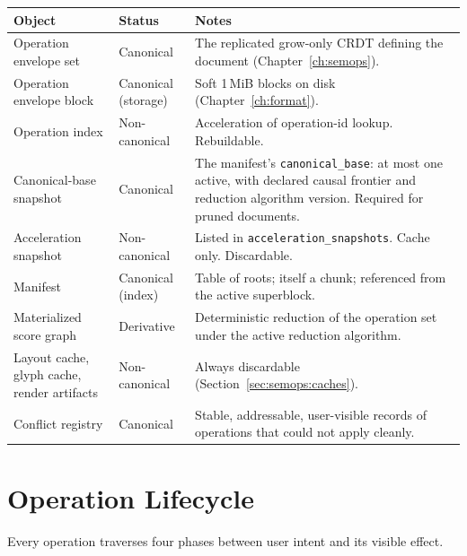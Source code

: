 \documentclass[11pt,letterpaper]{report}
\begin{document}
\begin{longtable}{p{4.4cm} p{4.0cm} p{5.2cm}}
  \toprule
  \textbf{Object} & \textbf{Status} & \textbf{Notes} \\
  \midrule
  \endhead
  Operation envelope set & Canonical &
    The replicated grow-only CRDT defining the document
    (Chapter~\ref{ch:semops}). \\
  Operation envelope block & Canonical (storage) &
    Soft 1\,MiB blocks on disk
    (Chapter~\ref{ch:format}). \\
  Operation index & Non-canonical &
    Acceleration of operation-id lookup. Rebuildable. \\
  Canonical-base snapshot & Canonical &
    The manifest's \texttt{canonical\_base}: at most one active,
    with declared causal frontier and reduction algorithm
    version. Required for pruned documents. \\
  Acceleration snapshot & Non-canonical &
    Listed in \texttt{acceleration\_snapshots}. Cache only.
    Discardable. \\
  Manifest & Canonical (index) &
    Table of roots; itself a chunk; referenced from the active
    superblock. \\
  Materialized score graph & Derivative &
    Deterministic reduction of the operation set under the
    active reduction algorithm. \\
  Layout cache, glyph cache, render artifacts &
    Non-canonical & Always discardable
    (Section~\ref{sec:semops:caches}). \\
  Conflict registry & Canonical &
    Stable, addressable, user-visible records of operations
    that could not apply cleanly. \\
  \bottomrule
\end{longtable}

\section*{Operation Lifecycle}

Every operation traverses four phases between user intent and
its visible effect.
\end{document}
